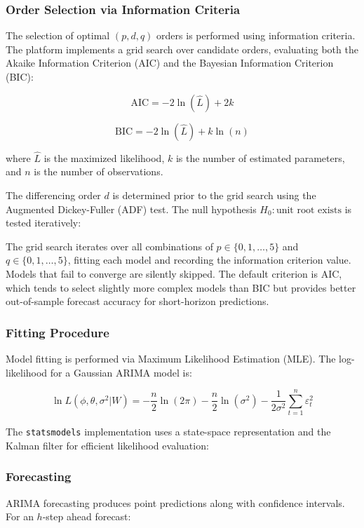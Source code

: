 \subsubsection{Order Selection via Information Criteria}

The selection of optimal $(p, d, q)$ orders is performed using information criteria. The platform implements a grid search over candidate orders, evaluating both the Akaike Information Criterion (AIC) and the Bayesian Information Criterion (BIC):

$$\text{AIC} = -2 \ln(\hat{L}) + 2k$$

$$\text{BIC} = -2 \ln(\hat{L}) + k \ln(n)$$

where $\hat{L}$ is the maximized likelihood, $k$ is the number of estimated parameters, and $n$ is the number of observations.

The differencing order $d$ is determined prior to the grid search using the Augmented Dickey-Fuller (ADF) test. The null hypothesis $H_0: \text{unit root exists}$ is tested iteratively:


The grid search iterates over all combinations of $p \in \{0, 1, \ldots, 5\}$ and $q \in \{0, 1, \ldots, 5\}$, fitting each model and recording the information criterion value. Models that fail to converge are silently skipped. The default criterion is AIC, which tends to select slightly more complex models than BIC but provides better out-of-sample forecast accuracy for short-horizon predictions.

\subsubsection{Fitting Procedure}

Model fitting is performed via Maximum Likelihood Estimation (MLE). The log-likelihood for a Gaussian ARIMA model is:

$$\ln L(\phi, \theta, \sigma^2 | W) = -\frac{n}{2} \ln(2\pi) - \frac{n}{2} \ln(\sigma^2) - \frac{1}{2\sigma^2} \sum_{t=1}^{n} \varepsilon_t^2$$

The \texttt{statsmodels} implementation uses a state-space representation and the Kalman filter for efficient likelihood evaluation:


\subsubsection{Forecasting}

ARIMA forecasting produces point predictions along with confidence intervals. For an $h$-step ahead forecast:

